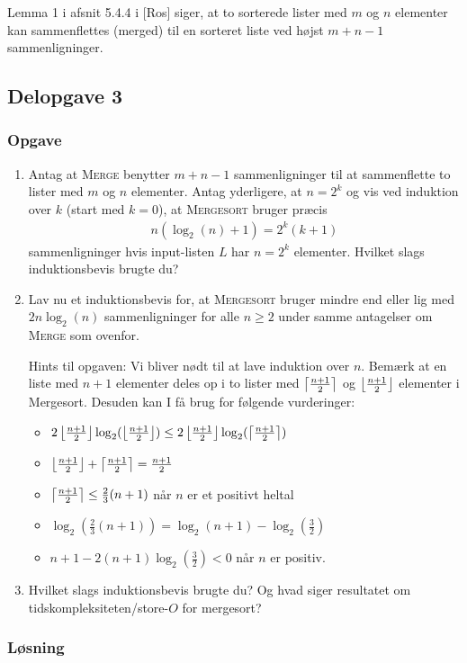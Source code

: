 Lemma 1 i afsnit 5.4.4 i [Ros] siger, at to sorterede lister med $m$ og $n$ elementer kan sammenflettes (merged) til en sorteret liste ved højst $m+n-1$ sammenligninger. 

\subsection{Delopgave 3}
\subsubsection{Opgave}
\begin{enumerate}
	\item Antag at \textsc{Merge} benytter $m+n-1$ sammenligninger til at sammenflette to lister med $m$ og $n$ elementer. Antag yderligere, at $n=2^k$ og vis ved induktion over $k$ (start med $k=0$), at \textsc{Mergesort} bruger præcis
	\begin{align*}
		n(\log_2(n)+1)=2^k(k+1)
	\end{align*}
	sammenligninger hvis input-listen $L$ har $n=2^k$ elementer. Hvilket slags induktionsbevis brugte du?
	\item Lav nu et induktionsbevis for, at \textsc{Mergesort} bruger mindre end eller lig med $2n\log_2(n)$ sammenligninger for alle $n\geq 2$ under samme antagelser om \textsc{Merge} som ovenfor. 
	
	Hints til opgaven: Vi bliver nødt til at lave induktion over $n$. Bemærk at en liste med $n+1$ elementer deles op i to lister med $\left\lceil{\frac{n+1}{2}}\right\rceil$ og $\left\lfloor{\frac{n+1}{2}}\right\rfloor$ elementer i Mergesort. Desuden kan I få brug for følgende vurderinger:
	\begin{itemize}
		\item $2\left\lfloor{\frac{n+1}{2}}\right\rfloor\log_2(\left\lfloor{\frac{n+1}{2}}\right\rfloor)\leq 2\left\lfloor{\frac{n+1}{2}}\right\rfloor\log_2(\left\lceil{\frac{n+1}{2}}\right\rceil)$
		\item $\left\lfloor{\frac{n+1}{2}}\right\rfloor+\left\lceil{\frac{n+1}{2}}\right\rceil=\frac{n+1}{2}$
		\item $\left\lceil{\frac{n+1}{2}}\right\rceil\leq \frac{2}{3}(n+1)$ når $n$ er et positivt heltal
		\item $\log_2(\frac{2}{3}(n+1))=\log_2(n+1)-\log_2(\frac{3}{2})$
		\item $n+1-2(n+1)\log_2(\frac{3}{2})<0$ når $n$ er positiv.
	\end{itemize}	 
	
	\item Hvilket slags induktionsbevis brugte du? Og hvad siger resultatet om tidskompleksiteten/store-$O$ for mergesort?
\end{enumerate}

\subsubsection{Løsning}
